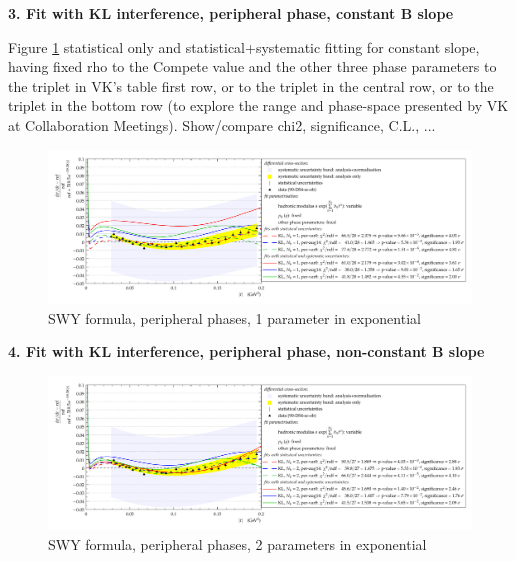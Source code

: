 {\bf 3. Fit with KL interference, peripheral phase, constant B slope}

Figure \ref{fig:90,KL,per,1}
statistical only and statistical+systematic fitting for constant slope, having fixed rho to the
Compete value and the other three phase parameters to the triplet in VK’s table first
row, or to the triplet in the central row, or to the triplet in the bottom row (to explore the
range and phase-space presented by VK at Collaboration Meetings).
Show/compare chi2, significance, C.L., ...

\begin{figure}
\begin{center}
\includegraphics[width=18cm]{simone/90/KL,per-var048,1,stat-stat+syst.pdf}
\vskip-3mm
\caption{SWY formula, peripheral phases, 1 parameter in exponential}
\label{fig:90,KL,per,1}
\end{center}
\end{figure}

{\bf 4. Fit with KL interference, peripheral phase, non-constant B slope}

\begin{figure}
\begin{center}
\includegraphics[width=18cm]{simone/90/KL,per-var048,2,stat-stat+syst.pdf}
\vskip-3mm
\caption{SWY formula, peripheral phases, 2 parameters in exponential}
\label{fig:90,KL,per,2}
\end{center}
\end{figure}

